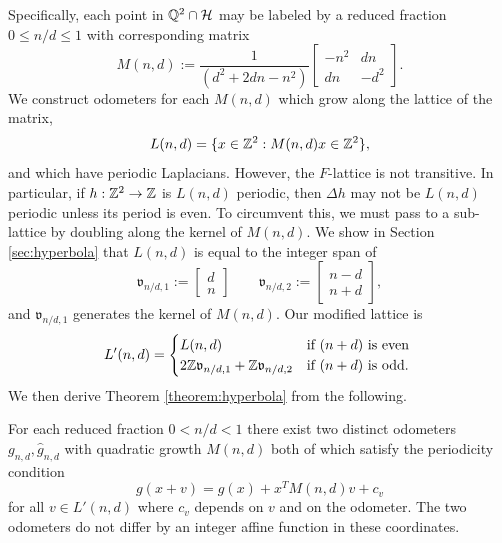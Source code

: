 \documentclass[12pt]{amsart}
\begin{document}
	Specifically, each point in $\mathbb{Q}^2 \cap \mathcal{H}$ may be labeled by a reduced fraction $0 \leq n/d \leq 1$
	with corresponding matrix
	\begin{equation}
	M(n,d) := \frac{1}{(d^2 + 2 d n - n^2)} \begin{bmatrix} -n^2 & d n \\ d n & -d^2 \end{bmatrix}.
	\end{equation}
	We construct odometers for each $M(n,d)$ which grow along the lattice of the matrix, 
	\begin{equation}
	L(n,d) = \{ x \in \mathbb{Z}^2 : M(n,d) x \in \mathbb{Z}^2 \},
	\end{equation}
	and which have periodic Laplacians. However, the $F$-lattice is not transitive.  In particular, if $h:\mathbb{Z}^2 \to \mathbb{Z}$ is $L(n,d)$ periodic, then $\Delta h$ may not be $L(n,d)$ periodic unless its period is even. To circumvent this, we must pass to a sub-lattice by doubling along the kernel of $M(n,d)$. 
	We show in Section \ref{sec:hyperbola} that $L(n,d)$ is equal to the integer span of 
	\begin{equation}
	\mathfrak{v}_{n/d, 1} := \begin{bmatrix} d  \\ n \end{bmatrix}
	\qquad
	\mathfrak{v}_{n/d,2}  := \begin{bmatrix} n -d \\ n + d \end{bmatrix},
	\end{equation}
	and $\mathfrak{v}_{n/d,1}$ generates the kernel of $M(n,d)$. 
	Our modified lattice is 
	\begin{equation}
	L'(n,d) = 
	\begin{cases}
	L(n,d) &\mbox{if $(n+d)$ is even } \\
	2 \mathbb{Z} \mathfrak{v}_{n/d,1} + \mathbb{Z} \mathfrak{v}_{n/d,2}  &\mbox{if $(n+d)$ is odd}.
	\end{cases}
	\end{equation}
	We then derive Theorem \ref{theorem:hyperbola} from the following. 
	\begin{theorem} \label{theorem:odometers}
	For each reduced fraction $0 < n/d < 1$ there exist two distinct odometers 
	$g_{n,d}, \hat{g}_{n,d}$ with quadratic growth $M(n,d)$ both of which satisfy the periodicity condition
	\begin{equation}\label{eq:periodicity}
	g(x + v) = g(x) + x^T M(n,d) v + c_v
	\end{equation}
	for all $v \in L'(n,d)$ where $c_v$ depends on $v$ and on the odometer. The two odometers do not differ by an integer affine function in these coordinates.
	\end{theorem}
\end{document}
